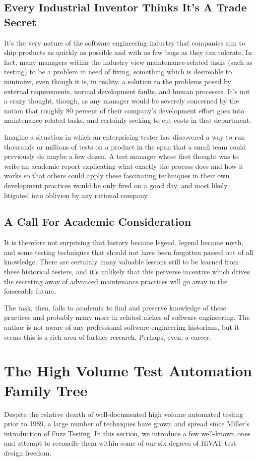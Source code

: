 \subsection{Every Industrial Inventor Thinks It's A Trade Secret}
It's the very nature of the software engineering industry that companies aim to ship products as quickly as possible and with as few bugs as they can tolerate. In fact, many managers within the industry view maintenance-related tasks (such as testing) to be a problem in need of fixing, something which is desireable to minimize, even though it is, in reality, a solution to the problems posed by external requirements, normal development faults, and human processes.\citep{glass2002Facts} It's not a crazy thought, though, as any manager would be severely concerned by the notion that roughly 80 percent of their company's development effort goes into maintenance-related tasks, and certainly seeking to cut costs in that department.\citep{pigoski1996practical}

Imagine a situation in which an enterprising tester has discovered a way to run thousands or millions of tests on a product in the span that a small team could previously do maybe a few dozen. A test manager whose first thought was to write an academic report explicating what exactly the process does and how it works so that others could apply these fascinating techniques in their own development practices would be only fired on a good day, and most likely litigated into oblivion by any rational company.

\subsection{A Call For Academic Consideration}
It is therefore not surprising that history became legend, legend became myth, and some testing techniques that should not have been forgotten passed out of all knowledge. There are certainly many valuable lessons still to be learned from these historical testers, and it's unlikely that this perverse incentive which drives the secreting away of advanced maintenance practices will go away in the forseeable future.

The task, then, falls to academia to find and preserve knowledge of these practices and probably many more in related niches of software engineering. The author is not aware of any professional software engineering historians, but it seems this is a rich area of further research. Perhaps, even, a career.

\section{The High Volume Test Automation Family Tree}
Despite the relative dearth of well-documented high volume automated testing prior to 1989, a large number of techniques have grown and spread since Miller's introduction of Fuzz Testing. In this section, we introduce a few well-known ones and attempt to reconcile them within some of our six degrees of HiVAT test design freedom.

